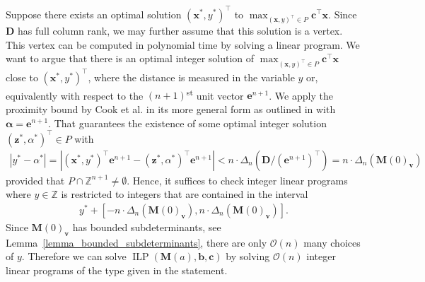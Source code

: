 \documentclass[a4paper, 11pt]{article}
\DeclareMathOperator{\ILP}{ILP}
\newcommand{\Z}{\mathbb{Z}}
\newcommand{\bD}{\bm{D}}
\newcommand{\bx}{\bm{x}}
\newcommand{\bc}{\bm{c}}
\newcommand{\bb}{\bm{b}}
\newcommand{\be}{\bm{e}}
\newcommand{\bv}{\bm{v}}
\newcommand{\bz}{\bm{z}}
\newcommand{\balpha}{\bm{\alpha}}
\newcommand{\bM}{\bm{M}}
\newcommand{\intvar}{a}
\newcommand{\polyM}{\bM}
\begin{document}
	Suppose there exists an optimal solution $(\bx^*,y^*)^\top$ to $\max_{(\bx,y)^\top\in P} \bc^\top\bx$.
	Since $\bD$ has full column rank, we may further assume that this solution is a vertex. 
	This vertex can be computed in polynomial time by solving a linear program. 
	We want to argue that there is an optimal integer solution of $\max_{(\bx,y)^\top\in P} \bc^\top\bx$ close to $(\bx^*,y^*)^\top$, where the distance is measured in the variable $y$ or, equivalently with respect to the $(n+1)$\textsuperscript{st} unit vector $\be^{n+1}$. We apply the proximity bound by Cook et al. \cite{CGST1986} in its more general form as outlined in \cite{celayakuhlpaatweis2023proxandflatness} with $\balpha = \be^{n+1}$. That guarantees the existence of some optimal integer solution $(\bz^*,\alpha^*)^\top\in P$ with  
	\begin{align*}
		\left|y^* - \alpha^*\right| = |(\bx^*,y^*)^\top\be^{n+1} - (\bz^*,\alpha^*)^\top\be^{n+1}| < n\cdot \Delta_n(\bD/(\be^{n+1})^\top)=n\cdot\Delta_n(\bM(0)_{\bv})
	\end{align*}
	provided that $P\cap\Z^{n+1}\neq \emptyset$. Hence, it suffices to check integer linear programs where $y\in \Z$ is restricted to integers that are contained in the interval 
	\begin{align}
		\label{proof_opt_interval}
		y^* + \left[- n\cdot\Delta_n\left(\bM(0)_{\bv}\right),n\cdot\Delta_n\left(\bM(0)_{\bv}\right)\right].
	\end{align}
Since $\bM(0)_{\bv}$ has bounded subdeterminants, see Lemma~\ref{lemma_bounded_subdeterminants}, there are only $\mathcal{O}(n)$ many choices of $y$. Therefore we can solve $\ILP(\bM(\intvar),\bb,\bc)$ by solving $\mathcal{O}(n)$ integer linear programs of the type given in the statement.
\end{document}
